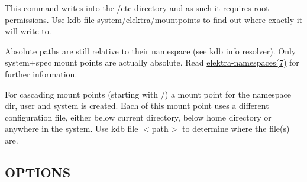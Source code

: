 This command writes into the {\ttfamily /etc} directory and as such it requires root permissions. Use {\ttfamily kdb file system/elektra/mountpoints} to find out where exactly it will write to.

Absolute paths are still relative to their namespace (see {\ttfamily kdb info resolver}). Only system+spec mount points are actually absolute. Read \hyperlink{md_doc_help_elektra-namespaces_doc_help_elektra-namespaces_md}{elektra-\/namespaces(7)} for further information.

For cascading mount points (starting with {\ttfamily /}) a mount point for the namespace {\ttfamily dir}, {\ttfamily user} and {\ttfamily system} is created. Each of this mount point uses a different configuration file, either below current directory, below home directory or anywhere in the system. Use {\ttfamily kdb file $<$path$>$} to determine where the file(s) are.

\subsection*{O\+P\+T\+I\+O\+NS}



